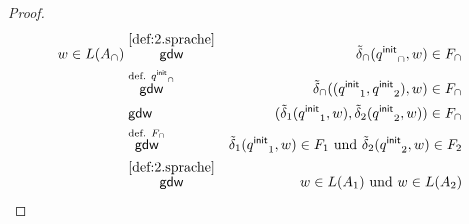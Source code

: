\begin{proof}
\begin{eqnarray*}
  w\in L(A_\cap)
  & \stackrel{\autoref{def:2.sprache}}{\mathsf{gdw}} & \tilde{\delta}_\cap(\qinit_\cap,w)\in F_\cap\\
  & \stackrel{\text{def. }\qinit_\cap}{\mathsf{gdw}} & \tilde{\delta}_\cap((\qinit_1,\qinit_2),w)\in F_\cap\\
  & \stackrel{}{\mathsf{gdw}} & (\tilde{\delta}_1(\qinit_1,w),\tilde{\delta}_2(\qinit_2,w))\in F_\cap\\
  & \stackrel{\text{def. }F_\cap}{\mathsf{gdw}} & \tilde{\delta}_1(\qinit_1,w)\in F_1 \text{ und } \tilde{\delta}_2(\qinit_2,w)\in F_2\\
  & \stackrel{\autoref{def:2.sprache}}{\mathsf{gdw}} & w\in L(A_1) \text{ und } w\in L(A_2)
\end{eqnarray*}
\end{proof}

